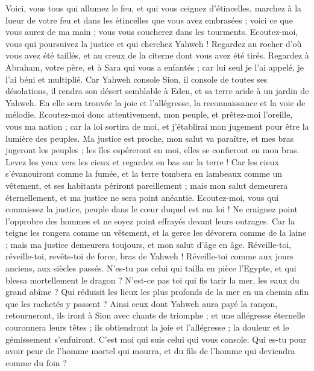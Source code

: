 \begin{multicols}{2}
Voici, vous tous qui allumez le feu, et qui vous ceignez d'étincelles, marchez à la lueur de votre feu et dans les étincelles que vous avez embrasées ; voici ce que vous aurez de ma main ; vous vous coucherez dans les tourments.
\VerseOne{}Ecoutez-moi, vous qui poursuivez la justice et qui cherchez Yahweh ! Regardez au rocher d'où vous avez été taillés, et au creux de la citerne dont vous avez été tirés.
Regardez à Abraham, votre père, et à Sara qui vous a enfantés ; car lui seul je l'ai appelé, je l'ai béni et multiplié.
Car Yahweh console Sion, il console de toutes ses désolations, il rendra son désert semblable à Eden, et sa terre aride à un jardin de Yahweh. En elle sera trouvée la joie et l'allégresse, la reconnaissance et la voie de mélodie.
Ecoutez-moi donc attentivement, mon peuple, et prêtez-moi l'oreille, vous ma nation ; car la loi sortira de moi, et j'établirai mon jugement pour être la lumière des peuples.
Ma justice est proche, mon salut va paraître, et mes bras jugeront les peuples ; les îles espéreront en moi, elles se confieront en mon bras.
Levez les yeux vers les cieux et regardez en bas sur la terre ! Car les cieux s'évanouiront comme la fumée, et la terre tombera en lambeaux comme un vêtement, et ses habitants périront pareillement ; mais mon salut demeurera éternellement, et ma justice ne sera point anéantie.
Ecoutez-moi, vous qui connaissez la justice, peuple dans le cœur duquel est ma loi ! Ne craignez point l'opprobre des hommes et ne soyez point effrayés devant leurs outrages.
Car la teigne les rongera comme un vêtement, et la gerce les dévorera comme de la laine ; mais ma justice demeurera toujours, et mon salut d'âge en âge.
Réveille-toi, réveille-toi, revêts-toi de force, bras de Yahweh ! Réveille-toi comme aux jours anciens, aux siècles passés. N'es-tu pas celui qui tailla en pièce l'Egypte, et qui blessa mortellement le dragon ?
N'est-ce pas toi qui fis tarir la mer, les eaux du grand abîme ? Qui réduisit les lieux les plus profonds de la mer en un chemin afin que les rachetés y passent ?
Ainsi ceux dont Yahweh aura payé la rançon, retourneront, ils iront à Sion avec chants de triomphe ; et une allégresse éternelle couronnera leurs têtes ; ils obtiendront la joie et l'allégresse ; la douleur et le gémissement s'enfuiront.
C'est moi qui suis celui qui vous console. Qui es-tu pour avoir peur de l'homme mortel qui mourra, et du fils de l'homme qui deviendra comme du foin ?

\end{multicols}
